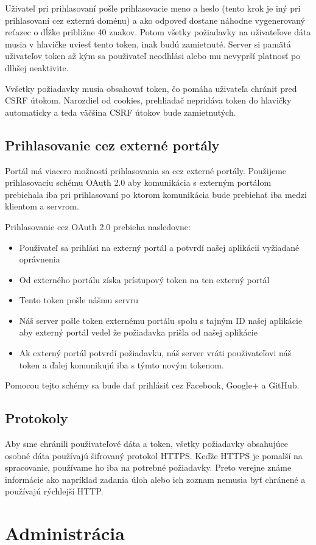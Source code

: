 Uživateľ pri prihlasovaní pošle prihlasovacie meno a heslo (tento krok je iný pri prihlasovaní cez externú doménu) a ako odpoveď
dostane náhodne vygenerovaný reťazec o dĺžke približne 40 znakov. Potom všetky požiadavky na uživateľove dáta
 musia v hlavičke uviesť tento token, inak budú zamietnuté.
Server si pamätá uživateľov token až kým sa použivateľ neodhlási alebo mu nevyprší platnosť po dlhšej neaktivite.

Vvšetky požiadavky musia obsahovať token, čo pomáha uživateľa chrániť pred CSRF útokom. Narozdiel od cookies,
prehliadač nepridáva token do hlavičky automaticky a teda väčšina CSRF útokov bude zamietnutých.

\subsection{Prihlasovanie cez externé portály}
Portál má viacero možností prihlasovania sa cez externé portály. Použijeme prihlasovaciu schému OAuth 2.0 aby komunikácia s externým
portálom prebiehala iba pri prihlasovaní po ktorom komunikácia bude prebiehať iba medzi klientom a servrom.

Prihlasovanie cez OAuth 2.0 prebieha nasledovne:
\begin{itemize}
\item{Použivateľ sa prihlási na externý portál a potvrdí našej aplikácii vyžiadané oprávnenia}
\item{Od externého portálu získa prístupový token na ten externý portál}
\item{Tento token pošle nášmu servru}
\item{Náš server pošle token externému portálu spolu s tajným ID našej aplikácie aby externý portál vedel že požiadavka prišla od našej aplikácie}
\item{Ak externý portál potvrdí požiadavku, náš server vráti použivateľovi náš token a ďalej komunikujú iba s týmto novým tokenom.}
\end{itemize}

Pomocou tejto schémy sa bude dať prihlásiť cez Facebook, Google+ a GitHub.

\subsection{Protokoly}
Aby sme chránili použivateľové dáta a token, všetky požiadavky obsahujúce osobné dáta používajú šifrovaný protokol HTTPS. Keďže HTTPS je pomalší na spracovanie,
používame ho iba na potrebné požiadavky. Preto verejne známe informácie ako napríklad zadania úloh alebo ich zoznam nemusia byť chránené a používajú rýchlejší HTTP.
\section{Administrácia}